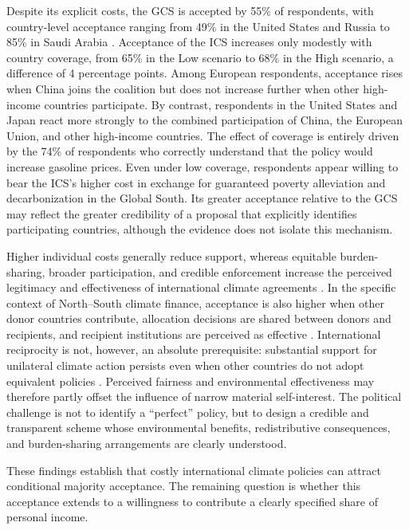 Despite its explicit costs, the GCS is accepted by 55\% of respondents, with country-level acceptance ranging from 49\% in the United States and Russia to 85\% in Saudi Arabia \citep{fabre_public_2026}. Acceptance of the ICS increases only modestly with country coverage, from 65\% in the Low scenario to 68\% in the High scenario, a difference of 4 %
percentage points. Among European respondents, acceptance rises when China joins the coalition but does not increase further when other high-income countries participate. By contrast, respondents in the United States and Japan react more strongly %
to the combined participation of China, the European Union, and other high-income countries. The effect of coverage is entirely driven by the 74\% of respondents who correctly understand that the policy would increase gasoline prices. Even under low coverage, respondents appear willing to bear the ICS's higher cost in exchange for guaranteed poverty alleviation and decarbonization in the Global South. Its greater acceptance relative to the GCS may reflect the greater credibility of a proposal that explicitly identifies participating countries, although the evidence does not isolate this mechanism.

Higher individual costs generally reduce support, whereas equitable burden-sharing, broader participation, and credible enforcement increase the perceived legitimacy and effectiveness of international climate agreements \citep{bechtel_mass_2013}. In the specific context of North--South climate finance, acceptance is also higher when other donor countries contribute, allocation decisions %
are shared between donors and recipients, and recipient institutions are perceived as effective \citep{gampfer_obtaining_2014}. International reciprocity is not, however, an absolute prerequisite: substantial support for unilateral climate action persists even when other countries do not adopt equivalent policies \citep{bernauer_how_2015,tingley_conditional_2014,mcgrath_how_2017}. Perceived fairness and environmental effectiveness may therefore partly offset the influence of narrow material self-interest. The political challenge is not to identify a ``perfect'' policy, but to design a credible and transparent scheme whose environmental benefits, redistributive consequences, and burden-sharing arrangements are clearly understood.

These findings establish that costly international climate policies can attract conditional majority acceptance. The remaining question is whether this acceptance extends to a willingness to contribute a clearly specified share of personal income.


